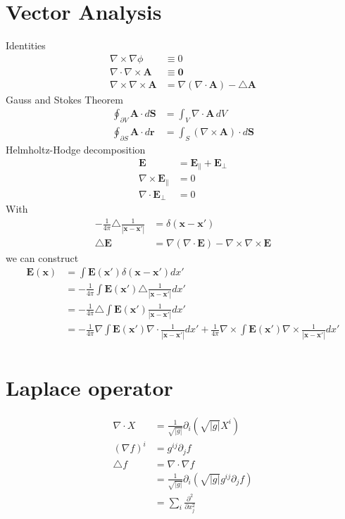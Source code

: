 \documentclass[10pt,a4paper]{book}
\theoremstyle{definition}
\begin{document}
\section{Vector Analysis}
Identities
\begin{align}
\nabla\times\nabla\phi&\equiv0\\
\nabla\cdot\nabla\times\mathbf{A}&\equiv\mathbf{0}\\
\nabla\times\nabla\times\mathbf{A}&=\nabla(\nabla\cdot\mathbf{A})-\triangle\mathbf{A}
\end{align}
Gauss and Stokes Theorem
\begin{align}
\oint_{\partial V}\mathbf{A}\cdot
d\mathbf{S}&=\int_V\nabla\cdot\mathbf{A}\,dV\\
\oint_{\partial S}\mathbf{A}\cdot
d\mathbf{r}&=\int_S(\nabla\times\mathbf{A})\cdot d\mathbf{S}
\end{align}
Helmholtz-Hodge decomposition
\begin{align}
\mathbf{E}&=\mathbf{E}_\parallel+\mathbf{E}_\perp\\
\nabla\times\mathbf{E}_\parallel&=0\\
\nabla\cdot\mathbf{E}_\perp&=0
\end{align}
With
\begin{align}
-\frac{1}{4\pi}\triangle\frac{1}{|\mathbf{x}-\mathbf{x}'|}&=\delta(\mathbf{x}-\mathbf{x}')\\
\triangle\mathbf{E}&=\nabla(\nabla\cdot\mathbf{E})-\nabla\times\nabla\times\mathbf{E}
\end{align}
we can construct
\begin{align}
\mathbf{E}(\mathbf{x})
&=\int \mathbf{E}(\mathbf{x}') \delta(\mathbf{x}-\mathbf{x}')dx'\\
&=-\frac{1}{4\pi}\int \mathbf{E}(\mathbf{x}')\triangle\frac{1}{|\mathbf{x}-\mathbf{x}'|}dx'\\
&=-\frac{1}{4\pi}\triangle\int \mathbf{E}(\mathbf{x}')\frac{1}{|\mathbf{x}-\mathbf{x}'|}dx'\\
&=-\frac{1}{4\pi}\nabla\int \mathbf{E}(\mathbf{x}')\nabla\cdot\frac{1}{|\mathbf{x}-\mathbf{x}'|}dx'+\frac{1}{4\pi}\nabla\times\int \mathbf{E}(\mathbf{x}')\nabla\times\frac{1}{|\mathbf{x}-\mathbf{x}'|}dx'\\
\end{align}

\section{Laplace operator}
\begin{align}
    \nabla\cdot X&=\frac{1}{\sqrt{|g|}}\partial_i\left(\sqrt{|g|}X^i\right)\\
    (\nabla f)^i&=g^{ij}\partial_jf\\
    \triangle f &= \nabla\cdot\nabla f\\
    &=\frac{1}{\sqrt{|g|}}\partial_i\left(\sqrt{|g|} g^{ij}\partial_jf \right)\\
    &= \sum_i \frac{\partial^2}{\partial x_j^2}
\end{align}
\end{document}
